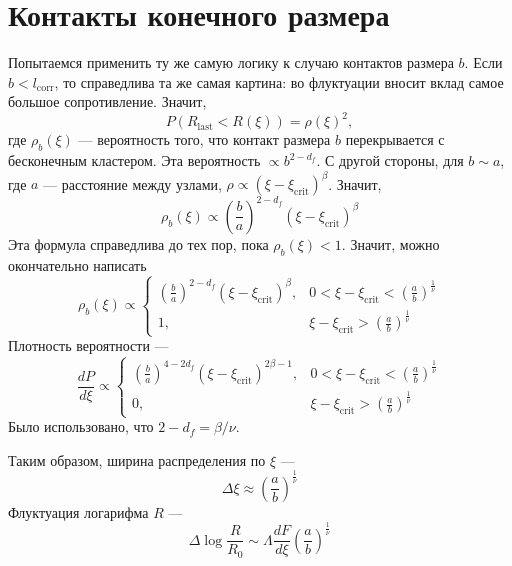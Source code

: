 \documentclass{article}
\begin{document}
\section{Контакты конечного размера}
Попытаемся применить ту же самую логику к случаю контактов размера $b$. Если 
$b < l_\mathrm{corr}$, то справедлива та же самая картина: во флуктуации вносит вклад самое
большое сопротивление. Значит,
\begin{equation}
    P(R_{\mathrm{last}} < R(\xi)) = \rho(\xi)^2,
\end{equation}
где $\rho_b(\xi)$ --- вероятность того, что контакт размера $b$ перекрывается с бесконечным 
кластером. Эта вероятность $\propto b^{2 - d_f}$. С другой стороны, для $b \sim a$, где 
$a$ --- расстояние между узлами, $\rho \propto (\xi - \xi_\mathrm{crit})^\beta$. Значит,
\begin{equation}
    \rho_b(\xi) \propto \left(\frac{b}{a}\right)^{2 - d_f} (\xi - \xi_\mathrm{crit})^\beta
\end{equation}
Эта формула справедлива до тех пор, пока $\rho_b(\xi) < 1$. Значит, можно окончательно написать
\begin{equation}
    \rho_b(\xi) \propto \left\{ 
                 \begin{matrix}   
                 \left(\frac{b}{a}\right)^{2 - d_f} (\xi - \xi_\mathrm{crit})^\beta, & 
                       0 < \xi-\xi_\mathrm{crit} < \left( \frac{a}{b}\right)^{\frac{1}{\nu}}\\
                  1, &  \xi - \xi_\mathrm{crit} > \left( \frac{a}{b}\right)^{\frac{1}{\nu}}
                 \end{matrix} \right.
\end{equation}
Плотность вероятности ---
\begin{equation}
    \frac{dP}{d\xi} \propto \left\{ 
                 \begin{matrix}   
                 \left(\frac{b}{a}\right)^{4 - 2d_f} (\xi - \xi_\mathrm{crit})^{2\beta - 1}, & 
                       0 < \xi-\xi_\mathrm{crit} < \left( \frac{a}{b}\right)^{\frac{1}{\nu}}\\
                  0, &  \xi - \xi_\mathrm{crit} > \left( \frac{a}{b}\right)^{\frac{1}{\nu}}
                 \end{matrix} \right.
\end{equation}
Было использовано, что $2 - d_f = \beta/\nu$.

Таким образом, ширина распределения по $\xi$ --- 
\begin{equation}    
    \Delta \xi \approx \left( \frac{a}{b}\right)^{\frac{1}{\nu}}
\end{equation}
Флуктуация логарифма $R$ --- 
\begin{equation}
    \Delta \log\frac{R}{R_0} \sim \Lambda \frac{dF}{d\xi}\left( \frac{a}{b}\right)^{\frac{1}{\nu}}
\end{equation}
\end{document}
